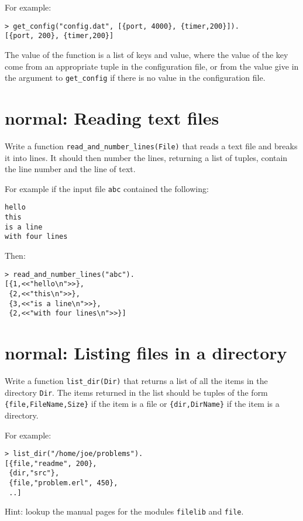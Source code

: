 \documentclass[12pt]{hitec}
\begin{document}
For example:
\begin{verbatim}
> get_config("config.dat", [{port, 4000}, {timer,200}]).
[{port, 200}, {timer,200}]
\end{verbatim}

The value of the function is a list of keys and value, where the
value of the key come from an appropriate tuple in the configuration
file, or from the value give in the argument to \verb+get_config+ if
there is no value in the configuration file.

\section{normal: Reading text files}

Write a function \verb+read_and_number_lines(File)+ that reads a text
file and breaks it into lines.  It should then number the lines,
returning a list of  tuples, contain the line number and the line of
text.

For example if the input file \verb+abc+ contained the following:

\begin{Verbatim}[frame=single]
hello
this
is a line
with four lines
\end{Verbatim}

Then:

\begin{Verbatim}
> read_and_number_lines("abc").
[{1,<<"hello\n">>},
 {2,<<"this\n">>},
 {3,<<"is a line\n">>},
 {2,<<"with four lines\n">>}]
\end{Verbatim}

\section{normal: Listing files in a directory}

Write a function \verb+list_dir(Dir)+ that returns a list of all the items
in the directory \verb+Dir+. The items returned in the list should be
tuples of the form
\verb+{file,FileName,Size}+ if the item is a file or \verb+{dir,DirName}+
if the item is a directory.

For example:

\begin{Verbatim}
> list_dir("/home/joe/problems").
[{file,"readme", 200},
 {dir,"src"},
 {file,"problem.erl", 450},
 ..]
\end{Verbatim}

Hint: lookup the manual pages for the modules \verb+filelib+ and \verb+file+.
\end{document}
